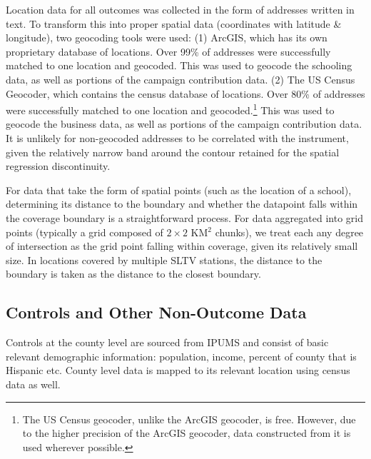 \documentclass[11pt]{article}
\begin{document}
Location data for all outcomes was collected in the form of addresses written in text. To transform this into proper spatial data (coordinates with latitude \& longitude), two geocoding tools were used: (1) ArcGIS, which has its own proprietary database of locations. Over 99\% of addresses were successfully matched to one location and geocoded. This was used to geocode the schooling data, as well as portions of the campaign contribution data. (2) The US Census Geocoder, which contains the census database of locations. Over 80\% of addresses were successfully matched to one location and geocoded.\footnote{The US Census geocoder, unlike the ArcGIS geocoder, is free. However, due to the higher precision of the ArcGIS geocoder, data constructed from it is used wherever possible. } This was used to geocode the business data, as well as portions of the campaign contribution data. It is unlikely for non-geocoded addresses to be correlated with the instrument, given the relatively narrow band around the contour retained for the spatial regression discontinuity.

For data that take the form of spatial points (such as the location of a school), determining its distance to the boundary and whether the datapoint falls within the coverage boundary is a straightforward process.  For data aggregated into grid points (typically a grid composed of $2 \times 2$ KM$^2$ chunks), we treat each any degree of intersection as the grid point falling within coverage, given its relatively small size. In locations covered by multiple SLTV stations, the distance to the boundary is taken as the distance to the closest boundary. %



\subsection{Controls and Other Non-Outcome Data}
Controls at the county level are sourced from IPUMS and consist of basic relevant demographic information: population, income, percent of county that is Hispanic etc. County level data is mapped to its relevant location using census data as well. 
\end{document}
